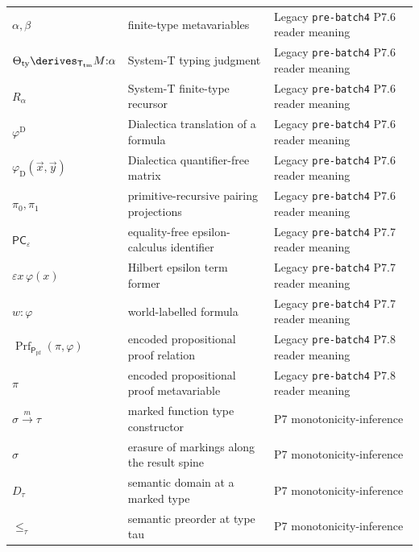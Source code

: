 \begin{longtable}{@{}p{}p{}p{}@{}}
\(\alpha,\allowbreak \beta\) & finite-type metavariables & Legacy \texttt{pre-\allowbreak{}batch4} P7.\allowbreak{}6 reader meaning \\
\(\Theta_{\mathrm{ty}}\derives_{\mathsf T_{\mathrm{tm}}}M{:}\alpha\) & System-T typing judgment & Legacy \texttt{pre-\allowbreak{}batch4} P7.\allowbreak{}6 reader meaning \\
\(R_\alpha\) & System-T finite-type recursor & Legacy \texttt{pre-\allowbreak{}batch4} P7.\allowbreak{}6 reader meaning \\
\(\varphi^{\mathrm D}\) & Dialectica translation of a formula & Legacy \texttt{pre-\allowbreak{}batch4} P7.\allowbreak{}6 reader meaning \\
\(\varphi_{\mathrm D}(\vec x,\allowbreak \vec y)\) & Dialectica quantifier-free matrix & Legacy \texttt{pre-\allowbreak{}batch4} P7.\allowbreak{}6 reader meaning \\
\(\pi_0,\allowbreak \pi_1\) & primitive-recursive pairing projections & Legacy \texttt{pre-\allowbreak{}batch4} P7.\allowbreak{}6 reader meaning \\
\(\mathsf{PC}_{\varepsilon}\) & equality-free epsilon-calculus identifier & Legacy \texttt{pre-\allowbreak{}batch4} P7.\allowbreak{}7 reader meaning \\
\(\varepsilon x\,\varphi(x)\) & Hilbert epsilon term former & Legacy \texttt{pre-\allowbreak{}batch4} P7.\allowbreak{}7 reader meaning \\
\(w{:}\varphi\) & world-labelled formula & Legacy \texttt{pre-\allowbreak{}batch4} P7.\allowbreak{}7 reader meaning \\
\(\operatorname{Prf}_{\mathsf P_{\mathrm{pf}}}(\pi,\allowbreak \varphi)\) & encoded propositional proof relation & Legacy \texttt{pre-\allowbreak{}batch4} P7.\allowbreak{}8 reader meaning \\
\(\pi\) & encoded propositional proof metavariable & Legacy \texttt{pre-\allowbreak{}batch4} P7.\allowbreak{}8 reader meaning \\
\(\sigma\xrightarrow m\tau\) & marked function type constructor & P7 monotonicity-\allowbreak{}inference \\
\(\widehat\sigma\) & erasure of markings along the result spine & P7 monotonicity-\allowbreak{}inference \\
\(D_\tau\) & semantic domain at a marked type & P7 monotonicity-\allowbreak{}inference \\
\(\leq_\tau\) & semantic preorder at type tau & P7 monotonicity-\allowbreak{}inference \\

\end{longtable}
